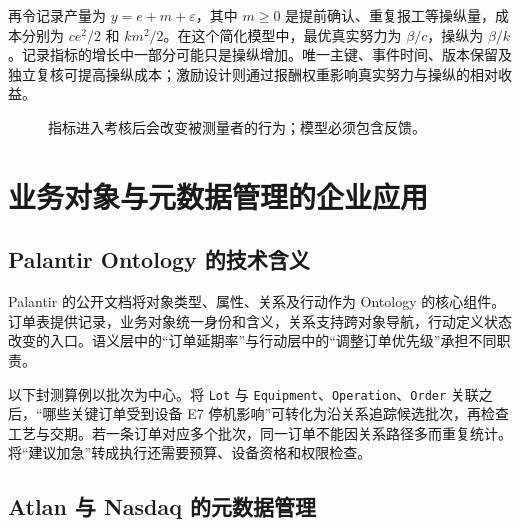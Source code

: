 再令记录产量为 \(y=e+m+\varepsilon\)，其中 \(m\ge0\) 是提前确认、重复报工等操纵量，成本分别为 \(ce^2/2\) 和 \(km^2/2\)。在这个简化模型中，最优真实努力为 \(\beta/c\)，操纵为 \(\beta/k\)。记录指标的增长中一部分可能只是操纵增加。唯一主键、事件时间、版本保留及独立复核可提高操纵成本；激励设计则通过报酬权重影响真实努力与操纵的相对收益。

\begin{figure}[htbp]
\centering
{}
\caption{指标进入考核后会改变被测量者的行为；模型必须包含反馈。}
\end{figure}

\section{业务对象与元数据管理的企业应用}

\subsection{Palantir Ontology 的技术含义}
Palantir 的公开文档将对象类型、属性、关系及行动作为 Ontology 的核心组件\cite{palantir02}。订单表提供记录，业务对象统一身份和含义，关系支持跨对象导航，行动定义状态改变的入口。语义层中的“订单延期率”与行动层中的“调整订单优先级”承担不同职责。

以下封测算例以批次为中心。将 \texttt{Lot} 与 \texttt{Equipment}、\texttt{Operation}、\texttt{Order} 关联之后，“哪些关键订单受到设备 E7 停机影响”可转化为沿关系追踪候选批次，再检查工艺与交期。若一条订单对应多个批次，同一订单不能因关系路径多而重复统计。将“建议加急”转成执行还需要预算、设备资格和权限检查。

\subsection{Atlan 与 Nasdaq 的元数据管理}

